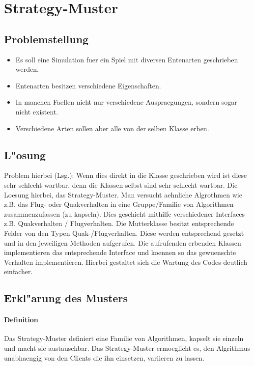\section{Strategy-Muster}

\subsection{Problemstellung}
\begin{itemize}
\item Es soll eine Simulation fuer ein Spiel mit diversen Entenarten geschrieben werden.
\item Entenarten besitzen verschiedene Eigenschaften.
\item In manchen Faellen nicht nur verschiedene Auspraegungen, sondern sogar nicht existent. 
\item Verschiedene Arten sollen aber alle von der selben Klasse erben. 
\end{itemize}

\subsection{L"osung}
Problem hierbei (Lsg.): 
Wenn  dies direkt in die Klasse geschrieben  wird ist diese sehr schlecht wartbar,  denn die Klassen selbst 
sind  sehr  schlecht wartbar. Die  Loesung  hierbei,  das  Strategy-Muster.  Man versucht  aehnliche
Algrothmen wie z.B. das Flug- oder Quakverhalten in eine Gruppe/Familie von Algorithmen 
zusammenzufassen (zu kapseln). Dies geschieht mithilfe verschiedener Interfaces z.B. 
Quakverhalten  /  Flugverhalten.  Die  Mutterklasse  besitzt  entsprechende  Felder  von  den  Typen
Quak-/Flugverhalten.  Diese werden entsprechend gesetzt  und in  den jeweiligen Methoden aufgerufen.
Die  aufrufenden erbenden  Klassen implementieren  das  entsprechende  Interface und  koennen so das
gewuenschte Verhalten  implementieren.  Hierbei  gestaltet  sich  die  Wartung  des  Codes  deutlich
einfacher.

\subsection{Erkl"arung des Musters}
\paragraph{Definition}
Das  Strategy-Muster definiert  eine  Familie von Algorithmen,  kapselt  sie  einzeln  und macht sie
austauschbar. Das Strategy-Muster  ermoeglicht  es, den  Algrithmus unabhaengig  von den Clients die
ihn einsetzen, variieren zu lassen.

